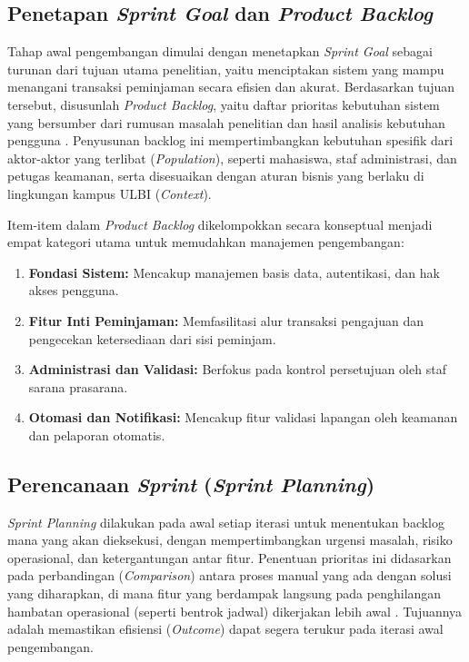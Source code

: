 \subsection{Penetapan \textit{Sprint Goal} dan \textit{Product Backlog}}
Tahap awal pengembangan dimulai dengan menetapkan \textit{Sprint Goal} sebagai turunan dari tujuan utama penelitian, yaitu menciptakan sistem yang mampu menangani transaksi peminjaman secara efisien dan akurat. Berdasarkan tujuan tersebut, disusunlah \textit{Product Backlog}, yaitu daftar prioritas kebutuhan sistem yang bersumber dari rumusan masalah penelitian dan hasil analisis kebutuhan pengguna \parencite{permana2015scrum}. Penyusunan backlog ini mempertimbangkan kebutuhan spesifik dari aktor-aktor yang terlibat (\textit{Population}), seperti mahasiswa, staf administrasi, dan petugas keamanan, serta disesuaikan dengan aturan bisnis yang berlaku di lingkungan kampus ULBI (\textit{Context}).

Item-item dalam \textit{Product Backlog} dikelompokkan secara konseptual menjadi empat kategori utama untuk memudahkan manajemen pengembangan:
\begin{enumerate}
    \item \textbf{Fondasi Sistem:} Mencakup manajemen basis data, autentikasi, dan hak akses pengguna.
    \item \textbf{Fitur Inti Peminjaman:} Memfasilitasi alur transaksi pengajuan dan pengecekan ketersediaan dari sisi peminjam.
    \item \textbf{Administrasi dan Validasi:} Berfokus pada kontrol persetujuan oleh staf sarana prasarana.
    \item \textbf{Otomasi dan Notifikasi:} Mencakup fitur validasi lapangan oleh keamanan dan pelaporan otomatis.
\end{enumerate}

\subsection{Perencanaan \textit{Sprint} (\textit{Sprint Planning})}
\textit{Sprint Planning} dilakukan pada awal setiap iterasi untuk menentukan backlog mana yang akan dieksekusi, dengan mempertimbangkan urgensi masalah, risiko operasional, dan ketergantungan antar fitur. Penentuan prioritas ini didasarkan pada perbandingan (\textit{Comparison}) antara proses manual yang ada dengan solusi yang diharapkan, di mana fitur yang berdampak langsung pada penghilangan hambatan operasional (seperti bentrok jadwal) dikerjakan lebih awal \parencite{Rifky2022}. Tujuannya adalah memastikan efisiensi (\textit{Outcome}) dapat segera terukur pada iterasi awal pengembangan.

